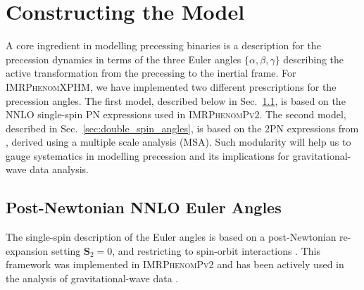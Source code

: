 \documentclass[%
aps,
prd,
amssymb,
amsmath,
amsfonts,
eqsecnum,
showpacs,
nofootinbib,
floatfix,
twocolumn,
twoside,
a4paper,
superscriptaddress
]{revtex4-1}
\newcommand{\bfStwo}{\boldsymbol{S}_2 \xspace}
\newcommand{\ppvtwo}{\textsc{IMRPhenomPv2}\xspace}
\newcommand{\phXPHM}{\textsc{IMRPhenomXPHM}\xspace}
\begin{document}

\section{Constructing the Model}
\label{sec:Model}

A core ingredient in modelling precessing binaries is a description for the precession dynamics in terms of the three Euler angles $\lbrace \alpha, \beta, \gamma \rbrace$ describing the active transformation from the precessing to the inertial frame. For \phXPHM, we have implemented two different prescriptions for the precession angles. The first model, described below in Sec.~\ref{sec:single_spin_angles}, is based on the NNLO single-spin PN expressions used in \ppvtwo \cite{Hannam:2013oca,Bohe:PPv2}. The second model,
described in Sec.~\ref{sec:double_spin_angles},
is based on the 2PN expressions from \cite{Chatziioannou:2017tdw}, derived using a multiple scale analysis (MSA). Such modularity will help us to gauge systematics in modelling precession and its implications for gravitational-wave data analysis. 


\subsection{Post-Newtonian NNLO Euler Angles}
\label{sec:single_spin_angles}
The single-spin description of the Euler angles is based on a post-Newtonian re-expansion setting $\bfStwo = 0$, and restricting to spin-orbit interactions \cite{Bohe:PPv2}. This framework was implemented in \ppvtwo \cite{Hannam:2013oca,Bohe:PPv2} and has been actively used in the analysis of gravitational-wave data \cite{LIGOScientific:2018mvr}. 
\end{document}
